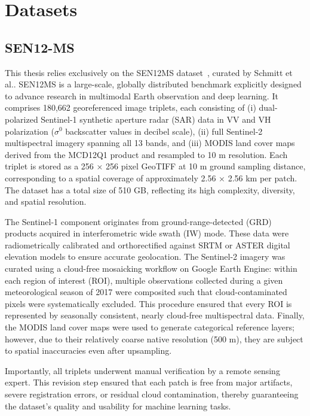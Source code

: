 \section{Datasets}
\label{sec:datasets}
\subsection{SEN12-MS}
This thesis relies exclusively on the SEN12MS dataset~\cite{sen12ms_2019}, curated by Schmitt et al.. SEN12MS is a large-scale, globally distributed benchmark explicitly designed to advance research in multimodal Earth observation and deep learning. It comprises 180,662 georeferenced image triplets, each consisting of (i) dual-polarized Sentinel-1 synthetic aperture radar (SAR) data in VV and VH polarization ($\sigma^{0}$ backscatter values in decibel scale), (ii) full Sentinel-2 multispectral imagery spanning all 13 bands, and (iii) MODIS land cover maps derived from the MCD12Q1 product and resampled to 10 m resolution. Each triplet is stored as a 256 × 256 pixel GeoTIFF at 10 m ground sampling distance, corresponding to a spatial coverage of approximately 2.56 × 2.56 km per patch. The dataset has a total size of 510 GB, reflecting its high complexity, diversity, and spatial resolution.

The Sentinel-1 component originates from ground-range-detected (GRD) products acquired in interferometric wide swath (IW) mode. These data were radiometrically calibrated and orthorectified against SRTM or ASTER digital elevation models to ensure accurate geolocation. The Sentinel-2 imagery was curated using a cloud-free mosaicking workflow on Google Earth Engine: within each region of interest (ROI), multiple observations collected during a given meteorological season of 2017 were composited such that cloud-contaminated pixels were systematically excluded. This procedure ensured that every ROI is represented by seasonally consistent, nearly cloud-free multispectral data. Finally, the MODIS land cover maps were used to generate categorical reference layers; however, due to their relatively coarse native resolution (500 m), they are subject to spatial inaccuracies even after upsampling.

Importantly, all triplets underwent manual verification by a remote sensing expert. This revision step ensured that each patch is free from major artifacts, severe registration errors, or residual cloud contamination, thereby guaranteeing the dataset’s quality and usability for machine learning tasks.

